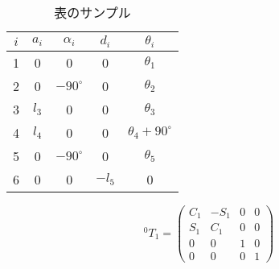 \documentclass[uplatex, a4paper]{jsarticle}
\begin{document}
  \begin{table}[h]
    \begin{center}
      \caption{表のサンプル}
      \begin{tabular}{|c||c|c|c|c|} \hline
        $i$ & $a_{i}$ & $\alpha_{i}$  & $d_{i}$  & $\theta_{i}$             \\ \hline \hline
         1  &    0    &       0       &    0     & $\theta_{1}$             \\ \hline
         2  &    0    & $-90^{\circ}$ &    0     & $\theta_{2}$             \\ \hline
         3  & $l_{3}$ &       0       &    0     & $\theta_{3}$             \\ \hline
         4  & $l_{4}$ &       0       &    0     & $\theta_{4}+90^{\circ}$  \\ \hline
         5  &    0    & $-90^{\circ}$ &    0     & $\theta_{5}$             \\ \hline
         6  &    0    &       0       & $-l_{5}$ &    0                     \\ \hline
      \end{tabular}
      \label{tab:dhparameter}
    \end{center}
  \end{table}

  \begin{equation}
  {}^0\!T_{1}=\begin{pmatrix} C_{1} & -S_{1} & 0 & 0 \\ S_{1} & C_1 & 0 & 0 \\ 0 & 0 & 1 & 0 \\ 0 & 0 & 0 & 1 \end{pmatrix}
  \end{equation}
\end{document}
